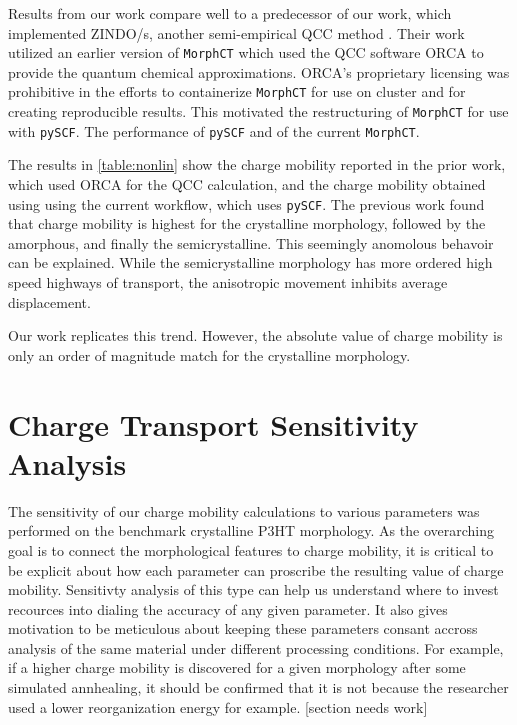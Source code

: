 Results from our work compare well to a predecessor of our work, which implemented ZINDO/s, another
semi-empirical QCC method \cite{Miller2018a}\cite{jones2017}. 
Their work utilized an earlier version of \texttt{MorphCT} which used the QCC software 
ORCA \cite{Neese2012b} to provide the quantum chemical approximations. 
ORCA's proprietary licensing was prohibitive in the efforts to containerize \texttt{MorphCT} for use on cluster and for
creating reproducible results. This motivated the restructuring of \texttt{MorphCT} for use with \texttt{pySCF}. The
performance of \texttt{pySCF} and of the current \texttt{MorphCT}.

The results in \ref{table:nonlin} show the charge mobility reported in the prior work, which used ORCA for
the QCC calculation, and the charge mobility obtained using using the current workflow, which uses \texttt{pySCF}. 
The previous work found that charge mobility is highest for the crystalline morphology, followed by the
amorphous, and finally the semicrystalline. This seemingly anomolous behavoir can be explained. While the
semicrystalline morphology has more ordered high speed highways of transport, the anisotropic movement
inhibits average displacement. 

Our work replicates this trend. However, the absolute value of charge mobility is only an order of magnitude
match for the crystalline morphology. 

\section{Charge Transport Sensitivity Analysis}

\label{sensitivity}

The sensitivity of our charge mobility calculations to various parameters was performed on the benchmark 
crystalline P3HT morphology. As the overarching goal is to connect the morphological features to charge
mobility, it is critical to be explicit about how each parameter can proscribe the resulting value of charge
mobility. Sensitivty analysis of this type can help us understand where to invest recources into dialing
the accuracy of any given parameter. It also gives motivation to be meticulous about keeping these parameters
consant accross analysis of the same material under different processing conditions. For example, if a higher
charge mobility is discovered for a given morphology after some simulated annhealing,
it should be confirmed that it is not because the researcher used a lower reorganization energy for example. 
[section needs work]


